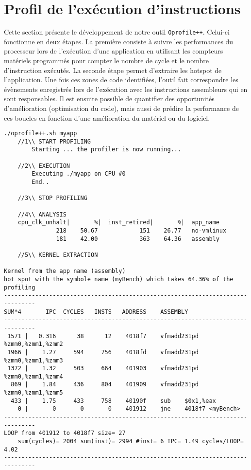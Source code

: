 \section{Profil de l'exécution d'instructions}\label{sec:oprofile}


Cette section présente le développement de notre outil \verb=Oprofile++=. Celui-ci fonctionne en deux étapes. La première consiste à suivre les performances du processeur lors de l'exécution d'une application en utilisant les compteurs matériels programmés pour compter le nombre de cycle et le nombre d'instruction exécutés. La seconde étape permet d'extraire les \gls{hotspot} de l'application. Une fois ces zones de code identifiées, l'outil fait correspondre les évènements enregistrés lors de l'exécution avec les instructions assembleurs qui en sont responsables. Il est ensuite possible de quantifier des opportunités d'amélioration (optimisation du code), mais aussi de prédire la performance de ces boucles en fonction d’une amélioration du matériel ou du logiciel.


\begin{lstlisting}[label=lst:dev_op_example, caption=Notre outil Oprofile++ permet d'extraire les instructions des noyaux de calcul à partir du code binaire de l'application et d'y associer des mesures d'évènements.]
./oprofile++.sh myapp
    //1\\ START PROFILING
        Starting ... the profiler is now running...
        
    //2\\ EXECUTION 
        Executing ./myapp on CPU #0
        End..
    
    //3\\ STOP PROFILING
    
    //4\\ ANALYSIS 
    cpu_clk_unhalt|       %|  inst_retired|       %|  app_name
               218    50.67            151    26.77   no-vmlinux
               181    42.00            363    64.36   assembly
    
    //5\\ KERNEL EXTRACTION

Kernel from the app name (assembly) 
hot spot with the symbole name (myBench) which takes 64.36% of the profiling
-------------------------------------------------------------------------------
SUM*4       IPC  CYCLES   INSTS   ADDRESS    ASSEMBLY
-------------------------------------------------------------------------------
 1571 |   0.316      38      12    4018f7    vfmadd231pd %zmm0,%zmm1,%zmm2
 1966 |    1.27     594     756    4018fd    vfmadd231pd %zmm0,%zmm1,%zmm3
 1372 |    1.32     503     664    401903    vfmadd231pd %zmm0,%zmm1,%zmm4
  869 |    1.84     436     804    401909    vfmadd231pd %zmm0,%zmm1,%zmm5
  433 |    1.75     433     758    40190f    sub    $0x1,%eax
    0 |       0       0       0    401912    jne    4018f7 <myBench>
-------------------------------------------------------------------------------
LOOP from 401912 to 4018f7 size= 27
    sum(cycles)= 2004 sum(inst)= 2994 #inst= 6 IPC= 1.49 cycles/LOOP= 4.02
-------------------------------------------------------------------------------
\end{lstlisting}

